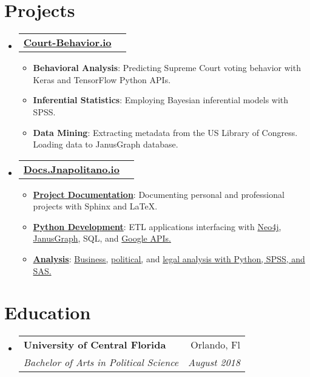 \documentclass[letterpaper,11pt]{article}
\makeatletter
\newcommand{\resumeItem}[2]{
  \item\small{
    \textbf{#1}{: #2 \vspace{-0pt}}
  }
}
\newcommand{\resumeSubheading}[4]{
  \vspace{-1pt}\item
    \begin{tabular*}{0.97\textwidth}[t]{l@{\extracolsep{\fill}}r}
      \textbf{#1} & #2 \\
      \textit{\small#3} & \textit{\small #4} \\
    \end{tabular*}\vspace{-5pt}
}
\newcommand{\resumeProject}[2]{
  \vspace{-1pt}\item
    \begin{tabular*}{0.97\textwidth}[t]{l@{\extracolsep{\fill}}r}
      \textbf{#1} & #2 \\
    \end{tabular*}\vspace{-5pt}
}
\newcommand{\resumeSubHeadingListStart}{\begin{itemize}[leftmargin=*]}
\newcommand{\resumeSubHeadingListEnd}{\end{itemize}}
\newcommand{\resumeItemListStart}{\begin{itemize}}
\newcommand{\resumeItemListEnd}{\end{itemize}\vspace{-5pt}}
\makeatother
\begin{document}
  \section{Projects}
    \resumeSubHeadingListStart
    \resumeProject
      {\href{https://court-behavior.io}{Court-Behavior.io}}{}
        \resumeItemListStart
          \resumeItem{Behavioral Analysis}
            {Predicting Supreme Court voting behavior with Keras and TensorFlow Python APIs.}
          \resumeItem{Inferential Statistics}
            {Employing Bayesian inferential models with SPSS.}
          \resumeItem{Data Mining}
            {Extracting metadata from the US Library of Congress.  Loading data to JanusGraph database.}
        \resumeItemListEnd
    \resumeProject
      {\href{docs.jnapolitano.io}{Docs.Jnapolitano.io}}{}
        \resumeItemListStart
          \resumeItem{\href{docs.jnapolitano.io}{Project Documentation}}
            {Documenting personal and professional projects with Sphinx and LaTeX.}
          \resumeItem{\href{https://docs.jnapolitano.io/index.html\#python-development}{Python Development}}
            {ETL applications interfacing with {\href{https://docs.jnapolitano.io/parts/python-development/neo4j/index.html}{Neo4j,}} {\href{https://docs.jnapolitano.io/parts/python-development/janus-graph/index.html}{JanusGraph}}, SQL, and {\href{https://docs.jnapolitano.io/parts/python-development/google/index.html}{Google APIs.}}}
          \resumeItem{\href{https://docs.jnapolitano.io/index.html\#analysis}{Analysis}}
            {{\href{https://docs.jnapolitano.io/parts/analysis/business-analysis/index.html}{Business,}} {\href{https://docs.jnapolitano.io/parts/analysis/political-analysis/index.html}{political,}} and {\href{https://docs.jnapolitano.io/parts/analysis/political-analysis/sup-court/index.html}{legal analysis with Python, SPSS, and SAS.}}}
          \resumeItemListEnd

  \resumeSubHeadingListEnd

  \section{Education}
    \resumeSubHeadingListStart
      \resumeSubheading
        {University of Central Florida}{Orlando, Fl}
        {Bachelor of Arts in Political Science}{August 2018}
    \resumeSubHeadingListEnd

\end{document}
